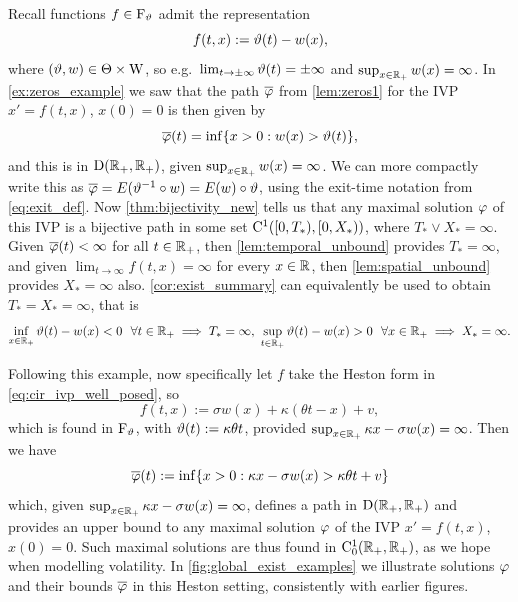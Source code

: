 \begin{example}\label{ex:global_exist}
    Recall functions $f\in\mathrm{F}_\vartheta$ admit the representation
    \begin{equation}
        f(t,x) := \vartheta(t) - w(x),
    \end{equation}
    where $(\vartheta,w)\in\Theta\times\mathrm{W}$, so e.g.~$\lim_{t\to\pm\infty}\vartheta(t)=\pm\infty$ and $\sup_{x\in\mathbb{R}_+}w(x)=\infty$. In \autoref{ex:zeros_example} we saw that the path $\overline{\varphi}$ from \autoref{lem:zeros1} for the IVP $x'=f(t,x)$, $x(0)=0$ is then given by
    \begin{equation}
        \overline{\varphi}(t)= \inf\{x>0:w(x)>\vartheta(t)\},
    \end{equation}
    and this is in $\mathrm{D}(\mathbb{R}_+,\mathbb{R}_+)$, given $\sup_{x\in\mathbb{R}_+}w(x)=\infty$. We can more compactly write this as $\overline{\varphi}=E(\vartheta^{-1}\circ w)=E(w)\circ\vartheta$, using the exit-time notation from \autoref{eq:exit_def}. Now \autoref{thm:bijectivity_new} tells us that any maximal solution $\varphi$ of this IVP is a bijective path in some set $\mathrm{C}^1([0,T_*),[0,X_*))$, where $T_*\vee X_*=\infty$. Given $\overline{\varphi}(t)<\infty$ for all $t\in\mathbb{R}_+$, then \autoref{lem:temporal_unbound} provides $T_*=\infty$, and given $\lim_{t\to\infty}f(t,x)=\infty$ for every $x\in\mathbb{R}$, then \autoref{lem:spatial_unbound} provides $X_*=\infty$ also. \autoref{cor:exist_summary} can equivalently be used to obtain $T_*=X_*=\infty$, that is
    \begin{equation}
        \inf_{x\in\RR_+}\vt(t) - w(x)<0\ \ \forall t\in\RR_+\implies T_*=\infty,\ \sup_{t\in\RR_+}\vt(t) - w(x)>0\ \ \forall x\in\RR_+\implies X_*=\infty.
    \end{equation}
\end{example}

\vspace{4mm}Following this example, now specifically let $f$ take the Heston form in \autoref{eq:cir_ivp_well_posed}, so
\begin{equation}
    f(t,x) := \sigma w(x) + \kappa(\theta t - x) + v,
\end{equation}
which is found in $\mathrm{F}_\vartheta$, with $\vartheta(t):=\kappa\theta t$, provided $\sup_{x\in\mathbb{R}_+}\kappa x - \sigma w(x)=\infty$. Then we have
\begin{equation}
    \overline{\varphi}(t):=\inf\{x>0: \kappa x - \sigma w(x) > \kappa\theta t + v\}
\end{equation}
which, given $\sup_{x\in\mathbb{R}_+}\kappa x - \sigma w(x)=\infty$, defines a path in $\mathrm{D}(\mathbb{R}_+,\mathbb{R}_+)$ and provides an upper bound to any maximal solution $\varphi$ of the IVP $x'=f(t,x)$, $x(0)=0$. Such maximal solutions are thus found in $\mathrm{C}^1_0(\mathbb{R}_+,\mathbb{R}_+)$, as we hope when modelling volatility. In \autoref{fig:global_exist_examples} we illustrate solutions $\varphi$ and their bounds $\overline{\varphi}$ in this Heston setting, consistently with earlier figures.


